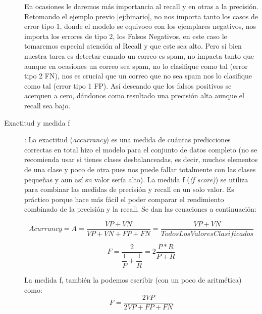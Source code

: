 \begin{description}
     En ocasiones le daremos más importancia al recall y en otras a la precisión. Retomando el ejemplo previo \ref{ej:binario}, no nos importa tanto los casos de error tipo 1, donde el modelo se equivoco con los ejemplares negativos, nos importa los errores de tipo 2, los Falsos Negativos, en este caso le tomaremos especial atención al Recall y que este sea alto. Pero si bien nuestra tarea es detectar cuando un correo es spam, no impacta tanto que aunque en ocasiones un correo sea spam, no lo clasifique como tal (error tipo 2 FN), nos es crucial que un correo que no sea spam nos lo clasifique como tal (error tipo 1 FP). Así deseando que los falsos positivos se acerquen a cero, dándonos como resultado una precisión alta aunque el recall sea bajo. 

     
 \item [Exactitud y medida f ]: La exactitud (\emph{accurrancy}) es una medida de cuántas predicciones correctas en total hizo el modelo para el conjunto de datos completo (no se recomienda usar si tienes clases desbalanceadas, es decir, muchos elementos de una clase y poco de otra pues nos puede fallar totalmente con las clases pequeñas y aun así su valor sería alto). La medida f (\emph{(f score)}) se utiliza para combinar las medidas de precisión y recall en un solo valor. Es práctico porque hace más fácil el poder comparar el rendimiento combinado de la precisión y la recall. Se dan las ecuaciones a continuación:
    
    \begin{equation}
     Acurrancy = A = \dfrac{VP+VN}{VP + VN + FP + FN} = \dfrac{VP+VN}{Todos Los Valores Clasificados}     
    \end{equation}

    \begin{equation}
     F = \dfrac{2}{\dfrac{1}{P} +\dfrac{1}{R} }= 2 \dfrac{P * R}{P + R}
    \end{equation}

La medida f, también la podemos escribir (con un poco de aritmética) como:
    \begin{equation}
     F = \dfrac{2VP}{2VP+FP+FN}
    \end{equation}
\end{description}


